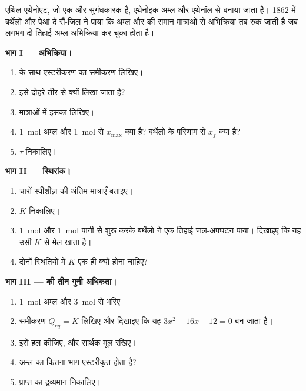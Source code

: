 \begin{problem}[{सप्ताहांत समस्या --- जब ऐल्कोहॉल तीन गुनी अधिकता में
डाला जाए तो कितना एस्टर?}]
\label{pb:g12:equilibrium:1}
एथिल एथेनोएट, जो एक  और सुगंधकारक है, एथेनोइक अम्ल
और एथेनॉल से बनाया जाता है। 1862 में बर्थेलो और पेआं दे सैं-जिल ने पाया कि
अम्ल और  की समान मात्राओं से अभिक्रिया तब रुक जाती है जब लगभग दो तिहाई
अम्ल अभिक्रिया कर चुका होता है।

\medskip
\noindent\textbf{भाग I --- अभिक्रिया।}
\begin{enumerate}
  \item {} के साथ एस्टरीकरण का समीकरण
        लिखिए।
  \item इसे दोहरे तीर से क्यों लिखा जाता है?
  \item मात्राओं में इसका  लिखिए।
  \item \qty{1}{mol} अम्ल और \qty{1}{mol}  से
        $x_{\max}$ क्या है? बर्थेलो के परिणाम से $x_f$ क्या है?
  \item $\tau$ निकालिए।
\end{enumerate}

\medskip
\noindent\textbf{भाग II --- स्थिरांक।}
\begin{enumerate}[resume]
  \item चारों स्पीशीज़ की अंतिम मात्राएँ बताइए।
  \item $K$ निकालिए।
  \item \qty{1}{mol}  और \qty{1}{mol} पानी से शुरू करके
        बर्थेलो ने एक तिहाई जल-अपघटन पाया। दिखाइए कि यह उसी
        $K$ से मेल खाता है।
  \item दोनों स्थितियों में $K$ एक ही क्यों होना चाहिए?
\end{enumerate}

\medskip
\noindent\textbf{भाग III ---  की तीन गुनी अधिकता।}
\begin{enumerate}[resume]
  \item \qty{1}{mol} अम्ल और \qty{3}{mol}  से
         भरिए।
  \item समीकरण $Q_{eq} = K$ लिखिए और दिखाइए कि यह
        $3x^2 - 16x + 12 = 0$ बन जाता है।
  \item इसे हल कीजिए, और सार्थक मूल रखिए।
  \item अम्ल का कितना भाग एस्टरीकृत होता है?
  \item प्राप्त  का द्रव्यमान निकालिए।
\end{enumerate}


\end{problem}
